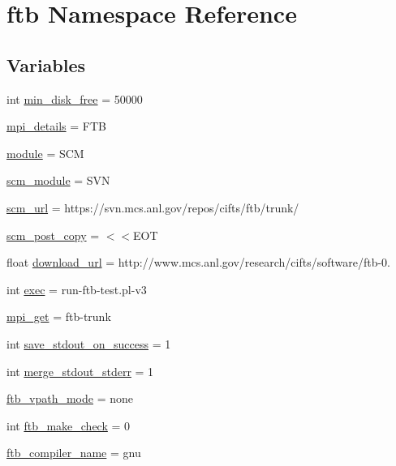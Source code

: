 \hypertarget{namespaceftb}{\section{ftb Namespace Reference}
\label{namespaceftb}
}
\subsection*{Variables}
\begin{DoxyCompactItemize}
\item 
int \hyperlink{namespaceftb_a6e146aa10e5dfce9215588877f36147e}{min\-\_\-disk\-\_\-free} = 50000
\item 
\hyperlink{namespaceftb_a8c62412466f196971725835c110873a2}{mpi\-\_\-details} = F\-T\-B
\item 
\hyperlink{namespaceftb_a06ea752188762f1575ad0dd65835373a}{module} = S\-C\-M
\item 
\hyperlink{namespaceftb_a26a832e4479187da7d76e4b52ec65ba0}{scm\-\_\-module} = S\-V\-N
\item 
\hyperlink{namespaceftb_a026e23a3b319d0b23c51013f5ef52090}{scm\-\_\-url} = https\-://svn.\-mcs.\-anl.\-gov/repos/cifts/ftb/trunk/
\item 
\hyperlink{namespaceftb_a4d7198772f78b31a4983c1dac25046e0}{scm\-\_\-post\-\_\-copy} = $<$$<$E\-O\-T
\item 
float \hyperlink{namespaceftb_ae96f515f42a6de5c342c0349668b1935}{download\-\_\-url} = http\-://www.\-mcs.\-anl.\-gov/research/cifts/software/ftb-\/0.
\item 
int \hyperlink{namespaceftb_a3708045a4f84247896c658014c72ec9b}{exec} = run-\/ftb-\/test.\-pl-\/v3
\item 
\hyperlink{namespaceftb_a398d20136ddd939bd203235b0dce9863}{mpi\-\_\-get} = ftb-\/trunk
\item 
int \hyperlink{namespaceftb_a1ec5d4a20c1eb705891e7dd81a73cd7f}{save\-\_\-stdout\-\_\-on\-\_\-success} = 1
\item 
int \hyperlink{namespaceftb_afd8660b1540ea079259bfe7501017590}{merge\-\_\-stdout\-\_\-stderr} = 1
\item 
\hyperlink{namespaceftb_ae1812ef9e1c7b0cc8fe32bc1183e452d}{ftb\-\_\-vpath\-\_\-mode} = none
\item 
int \hyperlink{namespaceftb_a802fd0e9b4205267172fbff8637bc8ae}{ftb\-\_\-make\-\_\-check} = 0
\item 
\hyperlink{namespaceftb_ac13591e7257052189dfc8d0b56084713}{ftb\-\_\-compiler\-\_\-name} = gnu
\item 
$$
\end{DoxyCompactItemize}
